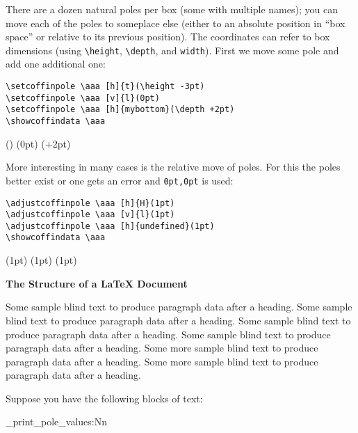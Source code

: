 \documentclass{article}
\newcommand\cbox[2][.8]{{\setlength\fboxsep{0pt}\colorbox[gray]{#1}{#2}}}
\begin{document}
There are a dozen natural poles per box (some with multiple names); you can
move each of the poles to someplace else (either to an absolute position in
``box space'' or relative to its previous position).  The coordinates can
refer to box dimensions (using \verb|\height|, \verb|\depth|,
 and \verb|width|). First we move some pole and add one
additional one:
\begin{verbatim}
\setcoffinpole \aaa [h]{t}(\height -3pt)
\setcoffinpole \aaa [v]{l}(0pt)
\setcoffinpole \aaa [h]{mybottom}(\depth +2pt)
\showcoffindata \aaa
\end{verbatim}
\setcoffinpole {}(\height -3pt)
\setcoffinpole {}(0pt)
\setcoffinpole {}(\depth +2pt)
\showcoffindata \aaa


More interesting in many cases is the relative move of poles. For this the
poles better exist or one gets an error and \texttt{0pt,0pt} is used:
\begin{verbatim}
\adjustcoffinpole \aaa [h]{H}(1pt)
\adjustcoffinpole \aaa [v]{l}(1pt)
\adjustcoffinpole \aaa [h]{undefined}(1pt)
\showcoffindata \aaa
\end{verbatim}
\adjustcoffinpole {}(1pt)
\adjustcoffinpole {}(1pt)
\adjustcoffinpole {}(1pt)
\showcoffindata \aaa



\sbox {}

\setvcoffin \bbb {11cm}
   {\raggedleft\normalfont\fontsize{36}{38pt}\bfseries 
    The Structure of a \LaTeX{} Document}

\setvcoffin \ccc {13cm}
   {Some sample blind text to produce paragraph data after a heading.
    Some sample blind text to produce paragraph data after a heading.
    Some sample blind text to produce paragraph data after a heading.
    Some sample blind text to produce paragraph data after a heading.
    \endgraf
    Some more sample blind text to produce paragraph data after a heading.
    Some more sample blind text to produce paragraph data after a heading.
}


Suppose you have the following blocks of text:

\bigskip

\noindent\cbox{\usebox\aaa}

\begin{multicols}{2}
\ttfamily\tiny
\ExplSyntaxOn
   \noindent \coffin_print_pole_values:Nn \aaa \\ 
\ExplSyntaxOff
\end{multicols}
\end{document}
